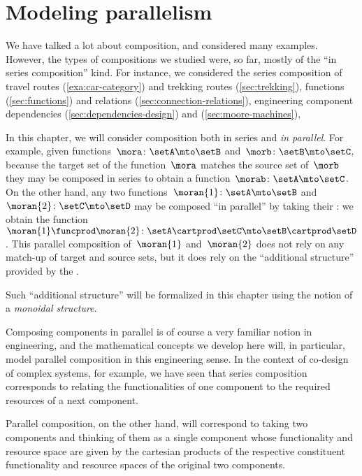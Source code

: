 
\section{Modeling parallelism}
\label{sec:modeling-parallelism}

We have talked a lot about composition, and considered many examples.
However, the types of compositions we studied were, so far, mostly of the ``in series composition'' kind.
For instance, we considered the series composition of travel routes (\cref{exa:car-category}) and trekking routes (\cref{sec:trekking}), functions (\cref{sec:functions}) and relations (\cref{sec:connection-relations}), engineering component dependencies (\cref{sec:dependencies-design}) and  (\cref{sec:moore-machines}), \etc

In this chapter, we will consider composition both in series and \emph{in parallel}.
For example, given functions~$\mora\colon \setA \mto \setB$ and~$\morb\colon \setB \mto \setC$, because the target set of the function~$\mora$ matches the source set of~$\morb$ they may be composed in series to obtain a function~$\morab\colon \setA \mto \setC$.
On the other hand, any two functions~$\moran{1} \colon \setA \mto \setB$ and~$\moran{2} \colon \setC \mto \setD$ may be composed ``in parallel'' by taking their : we obtain the function~$\moran{1} \funcprod \moran{2}\colon \setA \cartprod \setC \mto \setB \cartprod \setD$.
This parallel composition of~$\moran{1}$ and~$\moran{2}$ does not rely on any match-up of target and source sets, but it does rely on the ``additional structure'' provided by the .

Such ``additional structure'' will be formalized in this chapter using the notion of a \emph{monoidal structure}.

Composing components in parallel is of course a very familiar notion in engineering, and the mathematical concepts we develop here will, in particular, model parallel composition in this engineering sense.
In the context of co-design of complex systems, for example, we have seen that series composition corresponds to relating the functionalities of one component to the required resources of a next component.


Parallel composition, on the other hand, will correspond to taking two components and thinking of them as a single component whose functionality and resource space are given by the cartesian products of the respective constituent functionality and resource spaces of the original two components.

